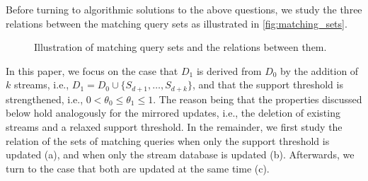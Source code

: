 Before turning to algorithmic solutions to the above
questions, we study the three relations between the
matching query sets as
illustrated in \autoref{fig:matching_sets}.

\begin{figure}[h]
\centering
{}
  \caption{Illustration of matching query sets and the
  relations between them.}
  \label{fig:matching_sets}
\end{figure}

In this paper, we focus on the case that $D_1$ is derived from
$D_0$
by the addition of $k$ streams, i.e., $D_1=D_0 \cup
\{S_{d+1}, \dots, S_{d+k}\}$, and that the support
threshold is strengthened, i.e., $0 < \theta_0 \leq
\theta_1 \leq 1$. The reason being that the properties
discussed below hold analogously for the mirrored
updates, i.e., the deletion of existing streams and a
relaxed support threshold.
In the remainder, we first study the relation of the
sets of matching queries
when only the support threshold is updated (a), and
when only the stream database is updated (b).
Afterwards, we turn to the case that both are updated
at the same time (c).



